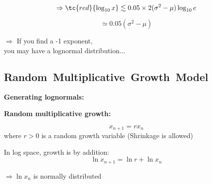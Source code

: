     $$
    \Rightarrow
    \tc{red}{\log_{10} x}
    \lesssim
    0.05\times2(\sigma^2 - \mu) 
    \log_{10} e
    $$
  
    $$
    \simeq 0.05 (\sigma^2 - \mu) 
    $$
  
    $\Rightarrow$ If you find a -1 exponent,\\
    \qquad you may have a lognormal distribution...
  



\subsection{Random\ Multiplicative\ Growth\ Model}

  \textbf{Generating lognormals:}

  \textbf{Random multiplicative growth:}
    
    
      $$ x_{n+1} = r x_n$$
      where $r>0$ is a random growth variable
     (Shrinkage is allowed)
    
      In log space, growth is by addition:
      $$ \ln x_{n+1} = \ln r + \ln x_n $$
    
      $\Rightarrow \ln x_{n}$ is normally distributed
      
